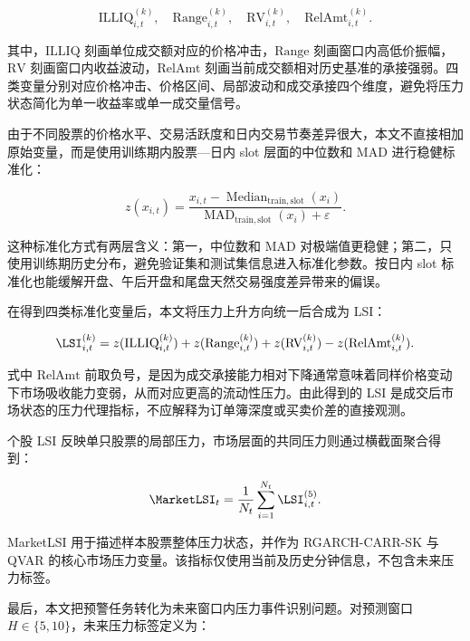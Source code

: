 \begin{equation}
\mathrm{ILLIQ}^{(k)}_{i,t}, \quad \mathrm{Range}^{(k)}_{i,t}, \quad \mathrm{RV}^{(k)}_{i,t}, \quad \mathrm{RelAmt}^{(k)}_{i,t}.
\end{equation}

其中，$\mathrm{ILLIQ}$ 刻画单位成交额对应的价格冲击，$\mathrm{Range}$ 刻画窗口内高低价振幅，$\mathrm{RV}$ 刻画窗口内收益波动，$\mathrm{RelAmt}$ 刻画当前成交额相对历史基准的承接强弱。四类变量分别对应价格冲击、价格区间、局部波动和成交承接四个维度，避免将压力状态简化为单一收益率或单一成交量信号。

由于不同股票的价格水平、交易活跃度和日内交易节奏差异很大，本文不直接相加原始变量，而是使用训练期内股票—日内 slot 层面的中位数和 MAD 进行稳健标准化：

\begin{equation}
z(x_{i,t})=\frac{x_{i,t}-\operatorname{Median}_{\mathrm{train},\mathrm{slot}}(x_i)}
{\operatorname{MAD}_{\mathrm{train},\mathrm{slot}}(x_i)+\varepsilon}.
\end{equation}

这种标准化方式有两层含义：第一，中位数和 MAD 对极端值更稳健；第二，只使用训练期历史分布，避免验证集和测试集信息进入标准化参数。按日内 slot 标准化也能缓解开盘、午后开盘和尾盘天然交易强度差异带来的偏误。

在得到四类标准化变量后，本文将压力上升方向统一后合成为 LSI：

\begin{equation}
\LSI^{(k)}_{i,t}
=
z(\mathrm{ILLIQ}^{(k)}_{i,t})
+
z(\mathrm{Range}^{(k)}_{i,t})
+
z(\mathrm{RV}^{(k)}_{i,t})
-
z(\mathrm{RelAmt}^{(k)}_{i,t}).
\end{equation}

式中 $\mathrm{RelAmt}$ 前取负号，是因为成交承接能力相对下降通常意味着同样价格变动下市场吸收能力变弱，从而对应更高的流动性压力。由此得到的 LSI 是成交后市场状态的压力代理指标，不应解释为订单簿深度或买卖价差的直接观测。

个股 LSI 反映单只股票的局部压力，市场层面的共同压力则通过横截面聚合得到：

\begin{equation}
\MarketLSI_t=\frac{1}{N_t}\sum_{i=1}^{N_t} \LSI^{(5)}_{i,t}.
\end{equation}

MarketLSI 用于描述样本股票整体压力状态，并作为 RGARCH-CARR-SK 与 QVAR 的核心市场压力变量。该指标仅使用当前及历史分钟信息，不包含未来压力标签。

最后，本文把预警任务转化为未来窗口内压力事件识别问题。对预测窗口 $H\in\{5,10\}$，未来压力标签定义为：

